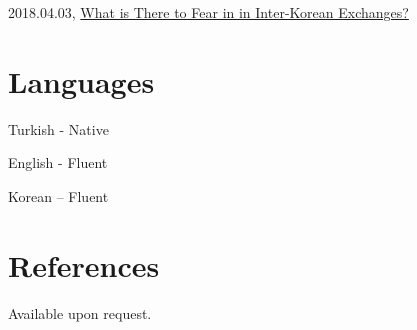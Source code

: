 \documentclass[11pt,a4paper,]{awesome-cv}
\begin{document}
2018.04.03,
\href{http://www.donga.com/news/List/Series_70040100000265/article/all/20180403/89427899/1}{What
is There to Fear in in Inter-Korean Exchanges?}

\hypertarget{languages}{%
\section{Languages}\label{languages}}

Turkish - Native

English - Fluent

Korean -- Fluent

\hypertarget{references}{%
\section{References}\label{references}}

Available upon request.
\end{document}
